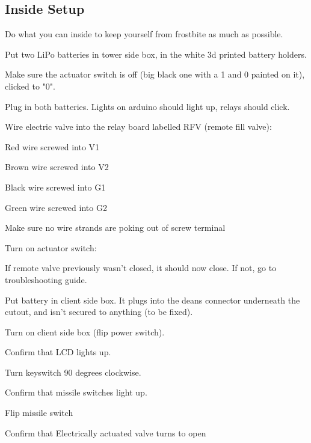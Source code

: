 \subsection{Inside Setup}
Do what you can inside to keep yourself from frostbite as much as possible.
\begin{checklist}
    \item Put two LiPo batteries in tower side box, in the white 3d printed 
battery holders.
    \item Make sure the actuator switch is off (big black one with a 1 and 0
painted on it), clicked to "0".
    \item Plug in both batteries. Lights on arduino should light up, relays
should click.
    \item Wire electric valve into the relay board labelled RFV (remote fill 
valve):
    \begin{checklist}
        \item Red wire screwed into V1
        \item Brown wire screwed into V2
        \item Black wire screwed into G1
        \item Green wire screwed into G2
        \item Make sure no wire strands are poking out of screw terminal
    \end{checklist}
    \item Turn on actuator switch:
    \begin{checklist}
        \item If remote valve previously wasn't closed, it should now close. If 
not, go to troubleshooting guide.
    \end{checklist}
    \item Put battery in client side box. It plugs into the deans connector
underneath the cutout, and isn't secured to anything (to be fixed).
    \item Turn on client side box (flip power switch).
    \begin{checklist}
        \item Confirm that LCD lights up.
    \end{checklist}
    \item Turn keyswitch 90 degrees clockwise.
    \begin{checklist}
        \item Confirm that missile switches light up.
    \end{checklist}
    \item Flip \rfill{} missile switch
    \begin{checklist}
        \item Confirm that Electrically actuated valve turns to open
    \end{checklist}


\end{checklist}
